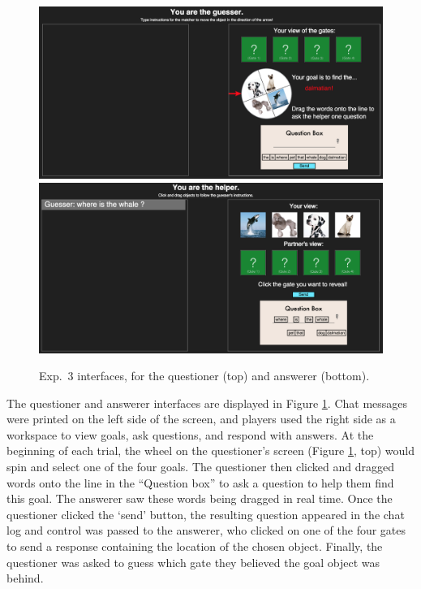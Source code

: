 \documentclass[12pt, floatsintext, jou]{apa6}
\begin{document}
	\begin{figure}[t!]
\begin{center}
\includegraphics[scale = .3]{Exp3GuesserView}
\includegraphics[scale = .3]{Exp3HelperView}
\end{center}
\vspace{-.5cm}
\caption{Exp.~3 interfaces, for the questioner (top) and answerer (bottom).}
\vspace{-.1cm}
\label{fig:exp3views}
\end{figure}

The questioner and answerer interfaces are displayed in Figure \ref{fig:exp3views}. Chat messages were printed on the left side of the screen, and players used the right side as a workspace to view goals, ask questions, and respond with answers. At the beginning of each trial, the wheel on the questioner's screen (Figure \ref{fig:exp3views}, top) would spin and select one of the four goals. The questioner then clicked and dragged words onto the line in the ``Question box'' to ask a question to help them find this goal. The answerer saw these words being dragged in real time. Once the questioner clicked the `send' button, the resulting question appeared in the chat log and control was passed to the answerer, who clicked on one of the four gates to send a response containing the location of the chosen object. Finally, the questioner was asked to guess which gate they believed the goal object was behind. 
\end{document}
